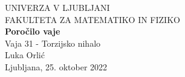 \begin{titlepage}
\begin{center}
\large UNIVERZA V LJUBLJANI
\\[1cm]
\large FAKULTETA ZA MATEMATIKO IN FIZIKO
\\[6cm]
\Large\textbf{Poročilo vaje}
\\[0.5cm]
Vaja 31 - Torzijsko nihalo 
\\[4cm]
Luka Orlić
\\[6.5cm]
Ljubljana, 25. oktober 2022
\end{center}
\end{titlepage}
